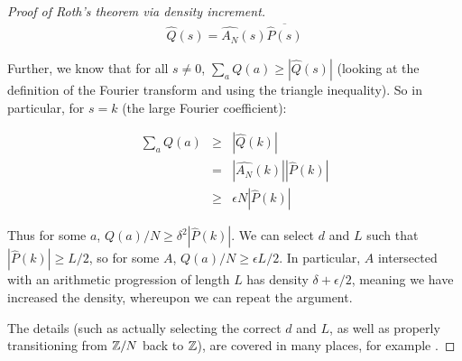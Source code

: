 \documentclass{report}
\theoremstyle{remark}
\numberwithin{equation}{section}
\begin{document}
\begin{proof}[Proof of Roth's theorem via density increment]
  \begin{eqnarray*}
    \widehat{Q}(s) = \widehat{A_N}(s) \overline{\widehat{P}(s)}
  \end{eqnarray*}
  
  Further, we know that for all $s \neq 0$,
  $\sum_a Q(a) \geq |\widehat{Q}(s)|$ (looking at the definition of
  the Fourier transform and using the triangle inequality).  So in
  particular, for $s = k$ (the large Fourier coefficient):

\begin{eqnarray*}
  \sum_a Q(a) &\geq& |\widehat{Q}(k)| \\
              &=& |\widehat{A_N}(k)| |\widehat{P}(k)| \\
              &\geq& \epsilon N |\widehat{P}(k)| 
\end{eqnarray*}

Thus for some $a$, $Q(a)/N \geq \delta^2 |\widehat{P}(k)|$.  We can
select $d$ and $L$ such that $|\widehat{P}(k)| \geq L/2$, so for some
$A$, $Q(a)/N \geq \epsilon L/2$.  In particular, $A$ intersected with
an arithmetic progression of length $L$ has density
$\delta + \epsilon/2$, meaning we have increased the density,
whereupon we can repeat the argument.

The details (such as actually selecting the correct $d$ and $L$, as
well as properly transitioning from $\mathbb{Z}/N$ back to $\mathbb{Z}$), are covered
in many places, for example \cite{roth:jlm1953}.

\end{proof}



\end{document}
